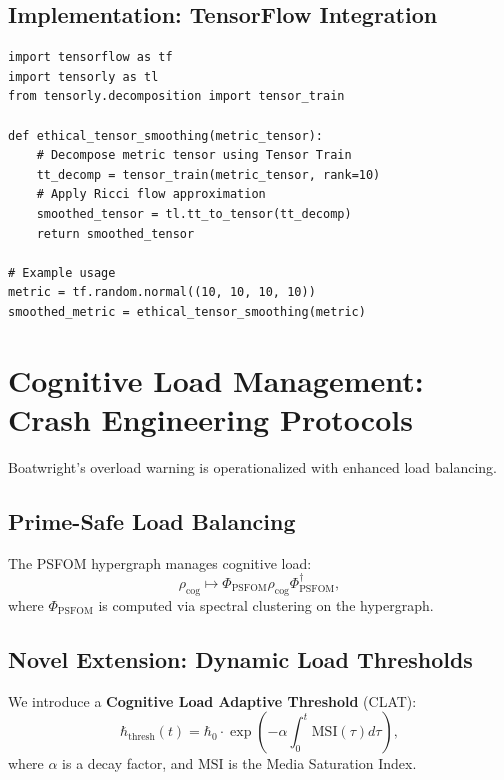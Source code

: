 \documentclass[12pt]{article}
\begin{document}
\subsection{Implementation: TensorFlow Integration}
\begin{verbatim}
import tensorflow as tf
import tensorly as tl
from tensorly.decomposition import tensor_train

def ethical_tensor_smoothing(metric_tensor):
    # Decompose metric tensor using Tensor Train
    tt_decomp = tensor_train(metric_tensor, rank=10)
    # Apply Ricci flow approximation
    smoothed_tensor = tl.tt_to_tensor(tt_decomp)
    return smoothed_tensor

# Example usage
metric = tf.random.normal((10, 10, 10, 10))
smoothed_metric = ethical_tensor_smoothing(metric)
\end{verbatim}

\section{Cognitive Load Management: Crash Engineering Protocols}
Boatwright’s overload warning is operationalized with enhanced load balancing.

\subsection{Prime-Safe Load Balancing}
The PSFOM hypergraph manages cognitive load:
\[
\rho_{\text{cog}} \mapsto \Phi_{\text{PSFOM}} \rho_{\text{cog}} \Phi_{\text{PSFOM}}^\dagger,
\]
where $\Phi_{\text{PSFOM}}$ is computed via spectral clustering on the hypergraph.

\subsection{Novel Extension: Dynamic Load Thresholds}
We introduce a \textbf{Cognitive Load Adaptive Threshold} (CLAT):
\[
\hbar_{\text{thresh}}(t) = \hbar_0 \cdot \exp\left(-\alpha \int_0^t \text{MSI}(\tau) d\tau\right),
\]
where $\alpha$ is a decay factor, and $\text{MSI}$ is the Media Saturation Index.
\end{document}
